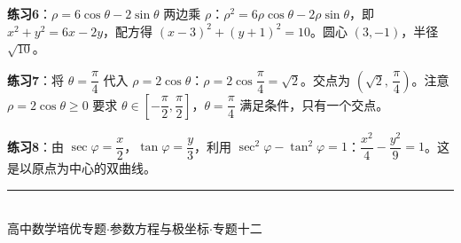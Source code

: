 \documentclass[12pt,a4paper]{ctexart}
\theoremstyle{definition}
\begin{document}
\medskip

\textbf{练习6}：$\rho=6\cos\theta-2\sin\theta$ 两边乘 $\rho$：$\rho^2=6\rho\cos\theta-2\rho\sin\theta$，即 $x^2+y^2=6x-2y$，配方得 $(x-3)^2+(y+1)^2=10$。圆心 $(3,-1)$，半径 $\sqrt{10}$。

\medskip

\textbf{练习7}：将 $\theta=\dfrac{\pi}{4}$ 代入 $\rho=2\cos\theta$：$\rho=2\cos\dfrac{\pi}{4}=\sqrt{2}$。交点为 $\left(\sqrt{2},\,\dfrac{\pi}{4}\right)$。注意 $\rho=2\cos\theta \geqslant 0$ 要求 $\theta\in\left[-\dfrac{\pi}{2},\dfrac{\pi}{2}\right]$，$\theta=\dfrac{\pi}{4}$ 满足条件，只有一个交点。

\medskip

\textbf{练习8}：由 $\sec\varphi=\dfrac{x}{2}$，$\tan\varphi=\dfrac{y}{3}$，利用 $\sec^2\varphi-\tan^2\varphi=1$：$\dfrac{x^2}{4}-\dfrac{y^2}{9}=1$。这是以原点为中心的双曲线。

\vfill

\begin{center}
  \color{gray}\rule{0.6\textwidth}{0.4pt}\\[6pt]
  {\small 高中数学培优专题\quad$\cdot$\quad 参数方程与极坐标\quad$\cdot$\quad 专题十二}
\end{center}
\end{document}
